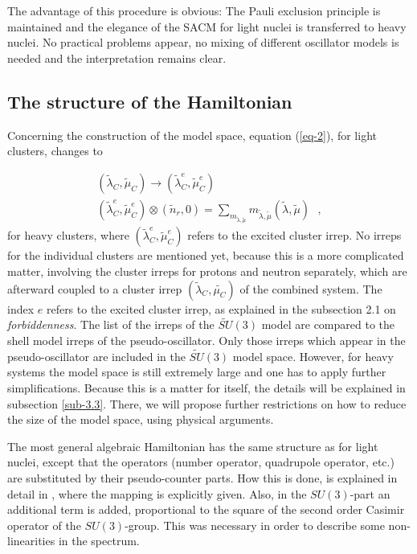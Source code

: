 \documentclass[12pt]{article}
\newcommand{\beqa}{\begin{eqnarray}}
\newcommand{\eeqa}{\end{eqnarray}}
\begin{document}
The advantage of this procedure is obvious: The Pauli exclusion principle is maintained and
the elegance of the SACM for light nuclei is transferred to heavy nuclei. No practical
problems appear, no mixing of different oscillator models is needed 
and the interpretation remains clear.


\subsection{The structure of the Hamiltonian}
\label{hamiltonian}

Concerning the construction of the model space, 
equation (\ref{eq-2}), for light clusters, changes to

\beqa
&
\left({\tilde \lambda}_C,{\tilde \mu}_C\right) \rightarrow
\left({\tilde \lambda}^e_C,{\tilde \mu}^e_C\right)
&
\nonumber \\
&
\left({\tilde \lambda}^e_C,{\tilde \mu}^e_C\right) 
\otimes
\left({\tilde n}_r , 0\right)  =  
\sum_{m_{{\tilde \lambda} , {\tilde \mu} }} m_{{\tilde \lambda} , {\tilde \mu}} 
\left( {\tilde \lambda} , {\tilde \mu} \right)
~~~,
&
\label{eq-4}
\eeqa
for heavy clusters,
where $\left({\tilde \lambda}^e_C,{\tilde \mu}^e_C\right)$ refers to the excited 
cluster irrep.
No irreps for the individual clusters are mentioned yet, because this is a more complicated
matter, involving the cluster irreps for protons and neutron separately, which are
afterward coupled to a cluster irrep 
$\left( \tilde{\lambda}_C,\tilde{\mu_C}\right)$
of the combined system. 
The index $e$ refers to the excited cluster irrep, as explained in the subsection 
2.1 on {\it forbiddenness}.
The list of the irreps of the $\widetilde{SU}(3)$  model  are compared to the shell model irreps
of the pseudo-oscillator.   Only those irreps which appear in the
pseudo-oscillator are included in the $\widetilde{SU}(3)$ model space. However, for heavy systems
the model space is still extremely large and one has to apply further simplifications. Because
this is a matter for itself, the details will be explained in subsection \ref{sub-3.3}.
There, we will propose further restrictions on how to reduce the size of the model space,
using physical arguments.

The most general algebraic Hamiltonian has the  same structure as for light nuclei, except that the
operators (number operator, quadrupole operator, etc.) are substituted by their pseudo-counter
parts. How this is done, is explained in detail in 
\cite{draayer1}, where the mapping is
explicitly given. Also, in the $SU(3)$-part an additional term is added, proportional to the
square of the second order Casimir operator of the $SU(3)$-group. This was necessary in
order to describe some non-linearities in the spectrum.
\end{document}
